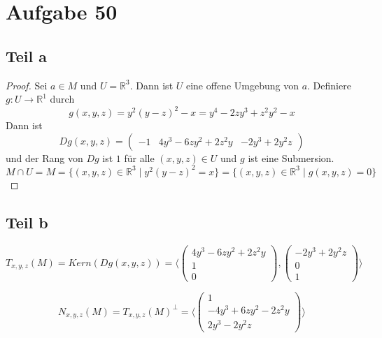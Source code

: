 \documentclass[10pt,a4paper]{article}
\begin{document}
\section{Aufgabe 50}

\subsection{Teil a}

\begin{proof}
  Sei $a \in M$ und $U = \mathbb{R}^{3}$.
  Dann ist $U$ eine offene Umgebung von $a$.
  Definiere $g : U \rightarrow \mathbb{R}^{1}$ durch
  \begin{equation}
    g(x, y, z) = y^{2}(y - z)^{2} - x = y^{4} - 2zy^{3} + z^{2}y^{2} - x
  \end{equation}
  Dann ist
  \begin{equation}
    Dg(x, y, z) = \begin{pmatrix}
      -1 & 4y^{3} - 6zy^{2} + 2z^{2}y & -2y^{3} + 2y^{2}z
    \end{pmatrix}
  \end{equation}
  und der Rang von $Dg$ ist $1$ für alle $(x, y, z) \in U$ und $g$ ist eine Submersion.
  \begin{equation}
    M \cap U = M = \{ (x, y, z) \in \mathbb{R}^{3} \mid y^{2}(y - z)^{2} = x \} = \{ (x, y, z) \in \mathbb{R}^{3} \mid g(x, y, z) = 0 \}
  \end{equation}
\end{proof}

\subsection{Teil b}

\begin{equation}
  T_{x, y, z}(M) = Kern(Dg(x, y, z)) = \langle \begin{pmatrix}
    4y^{3} - 6zy^{2} + 2z^{2}y\\1\\0
  \end{pmatrix},
  \begin{pmatrix}
    -2y^{3} + 2y^{2}z\\0\\1
  \end{pmatrix}\rangle
\end{equation}

\begin{equation}
  N_{x, y, z}(M) = T_{x, y, z}(M)^{\perp} = \langle
  \begin{pmatrix}
    1\\-4y^{3} + 6zy^{2} - 2z^{2}y\\2y^{3} - 2y^{2}z
  \end{pmatrix}
  \rangle
\end{equation}
\end{document}

